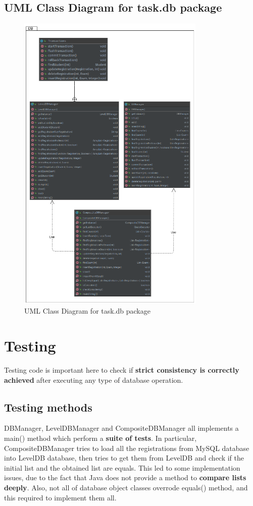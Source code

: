 \documentclass{report}
\begin{document}
\subsection*{UML Class Diagram for task.db package}
\begin{figure} [!ht]
	\centering
	\includegraphics[width=0.8\textwidth]{jpaLevelDB-DBPackage.png}
	\caption{UML Class Diagram for task.db package}
	\label{fig:leveldb-classdia}
\end{figure}


\section*{Testing}
Testing code is important here to check if \textbf{strict consistency is correctly achieved} after executing any type of database operation.

\subsection*{Testing methods}
DBManager, LevelDBManager and CompositeDBManager all implements a main() method which perform a \textbf{suite of tests}. In particular, CompositeDBManager tries to load all the registrations from MySQL database into LevelDB database, then tries to get them from LevelDB and check if the initial list and the obtained list are equals. This led to some implementation issues, due to the fact that Java does not provide a method to \textbf{compare lists deeply}. Also, not all of database object classes overrode equals() method, and this required to implement them all.
\end{document}
